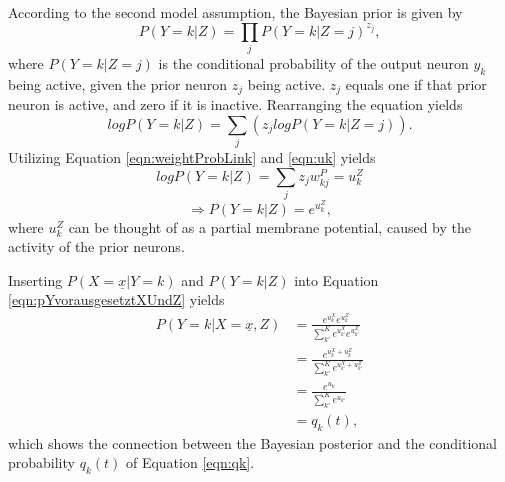 According to the second model assumption, the Bayesian prior is given by
\begin{equation}
\label{eqn:P2}
P(Y=k|Z) = \prod_j P(Y=k|Z=j)^{z_j},
\end{equation}
where $P(Y=k|Z=j)$ is the conditional probability of the output neuron $y_k$ being active, given the prior neuron $z_j$ being active. $z_j$ equals one if that prior neuron is active, and zero if it is inactive. Rearranging the equation yields
\begin{equation}
log P(Y=k|Z) = \sum_j (z_j log P(Y=k|Z=j)).
\end{equation}
Utilizing Equation \ref{eqn:weightProbLink} and \ref{eqn:uk}  yields
\begin{equation}
log P(Y=k|Z) = \sum_j z_j w^P_{kj} = u^Z_k
\end{equation}
\begin{equation}
\Rightarrow P(Y=k|Z) = e^{u^Z_k},
\end{equation}
where $u^Z_k$ can be thought of as a partial membrane potential, caused by the activity of the prior neurons.

Inserting $P(X=\underline{x}|Y=k)$ and $P(Y=k|Z)$ into Equation \ref{eqn:pYvorausgesetztXUndZ} yields
\begin{equation}
\begin{split}
P(Y=k|X=\underline{x},Z) &= \frac{e^{u^X_k} e^{u^Z_k}}{\sum^K_{k'} e^{u^X_{k'}} e^{u^Z_{k'}}}\\
&= \frac{e^{u^X_k + u^Z_k}}{\sum^K_{k'} e^{u^X_{k'} + u^Z_{k'}}}\\
&= \frac{e^{u_k}}{\sum^K_{k'} e^{u_{k'}}}\\
&= q_k(t),
\end{split}
\end{equation}
which shows the connection between the Bayesian posterior and the conditional probability $q_k(t)$ of Equation \ref{eqn:qk}.
